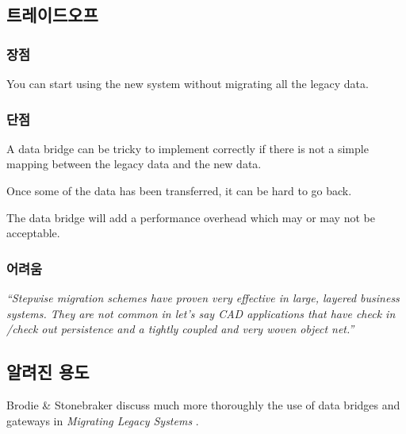\documentclass[a4paper,10pt,twoside]{book}
\begin{document}
\subsection*{트레이드오프}

\subsubsection*{장점}

\begin{bulletlist}
\item You can start using the new system without migrating all the legacy data.
\end{bulletlist}

\subsubsection*{단점}

\begin{bulletlist}
\item A data bridge can be tricky to implement correctly if there is not a simple mapping between the legacy data and the new data.

\item Once some of the data has been transferred, it can be hard to go back.

\item The data bridge will add a performance overhead which may or may not be acceptable.
\end{bulletlist}

\subsubsection*{어려움}

\begin{bulletlist}
\item \emph{``Stepwise migration schemes have proven very effective in large, layered business systems. They are not common in let's say CAD applications that have check in /check out persistence and a tightly coupled and very woven object net.''} \cite{Kell00a}
\end{bulletlist}

\subsection*{알려진 용도}

Brodie \& Stonebraker discuss much more thoroughly the use of data bridges and gateways in \emph{Migrating Legacy Systems} \cite{Brod95a}. 
\end{document}
